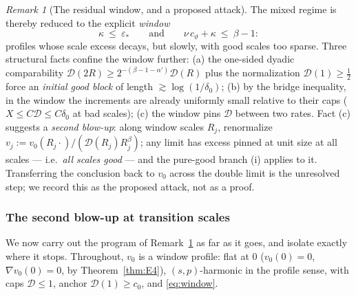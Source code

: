 \documentclass[11pt]{amsart}
\theoremstyle{plain}
\theoremstyle{definition}
\theoremstyle{remark}
\newtheorem{remark}[theorem]{Remark}
\newcommand{\al}{\alpha}
\begin{document}
\begin{remark}[The residual window, and a proposed attack]
\label{rem:window}
The mixed regime is thereby reduced to the explicit \emph{window}
\begin{equation}\label{eq:window}
  \kappa\ \le\ \varepsilon_*
  \qquad\text{and}\qquad
  \nu\,c_\vartheta+\kappa\ \le\ \beta-1 :
\end{equation}
profiles whose scale excess decays, but slowly, with good scales too
sparse. Three structural facts confine the window further:
\textnormal{(a)} the one-sided dyadic comparability
$\mathcal D(2R)\ge2^{-(\beta-1-\al')}\mathcal D(R)$ plus the normalization
$\mathcal D(1)\ge\frac12$ force an \emph{initial good block} of length
$\gtrsim\log(1/\delta_0)$; \textnormal{(b)} by the bridge inequality, in
the window the increments are already uniformly small relative to their
caps ($X\le C\mathcal D\le C\delta_0$ at bad scales); \textnormal{(c)} the
window pins $\mathcal D$ between two rates. Fact (c) suggests a
\emph{second blow-up}: along window scales $R_j$, renormalize
$v_j:=v_0(R_j\cdot)/(\mathcal D(R_j)R_j^{\beta})$; any limit has excess
pinned at unit size at all scales --- i.e.\ \emph{all scales good} --- and
the pure-good branch (i) applies to it. Transferring the conclusion back
to $v_0$ across the double limit is the unresolved step; we record this as
the proposed attack, not as a proof.
\end{remark}

\subsubsection*{The second blow-up at transition scales}
We now carry out the program of Remark~\ref{rem:window} as far as it goes,
and isolate exactly where it stops. Throughout, $v_0$ is a window profile:
flat at $0$ \textnormal{(}$v_0(0)=0$, $\nabla v_0(0)=0$, by
Theorem~\ref{thm:E4}\textnormal{)}, $(s,p)$-harmonic in the profile sense,
with caps $\mathcal D\le1$, anchor $\mathcal D(1)\ge c_0$, and
\eqref{eq:window}.
\end{document}
